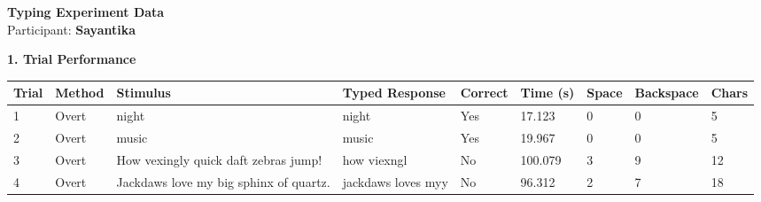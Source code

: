 \documentclass[10pt,a4paper]{article}
\begin{document}

\begin{center}
    {\Large\bfseries Typing Experiment Data}\\
    \vspace{2pt}
    Participant: \textbf{Sayantika}
\end{center}

\vspace{0.25cm}


\noindent
{\large\bfseries 1. Trial Performance}

\vspace{0.08cm}

\begin{center}
\begin{tabularx}{\textwidth}{
    C{0.45in}
    C{0.65in}
    L{2.35in}
    L{2.55in}
    C{0.65in}
    C{0.65in}
    C{0.55in}
    C{0.75in}
    C{0.55in}
}
\toprule

\textbf{Trial} &
\textbf{Method} &
\textbf{Stimulus} &
\textbf{Typed Response} &
\textbf{Correct} &
\textbf{Time (s)} &
\textbf{Space} &
\textbf{Backspace} &
\textbf{Chars}
\\

\midrule

1 &
Overt &
night &
night &
Yes &
17.123 &
0 &
0 &
5
\\

2 &
Overt &
music &
music &
Yes &
19.967 &
0 &
0 &
5
\\

3 &
Overt &
How vexingly quick daft zebras jump! &
how  viexngl &
No &
100.079 &
3 &
9 &
12
\\

4 &
Overt &
Jackdaws love my big sphinx of quartz. &
jackdaws loves myy &
No &
96.312 &
2 &
7 &
18
\\

\bottomrule
\end{tabularx}
\end{center}

\vspace{0.35cm}

\end{document}
